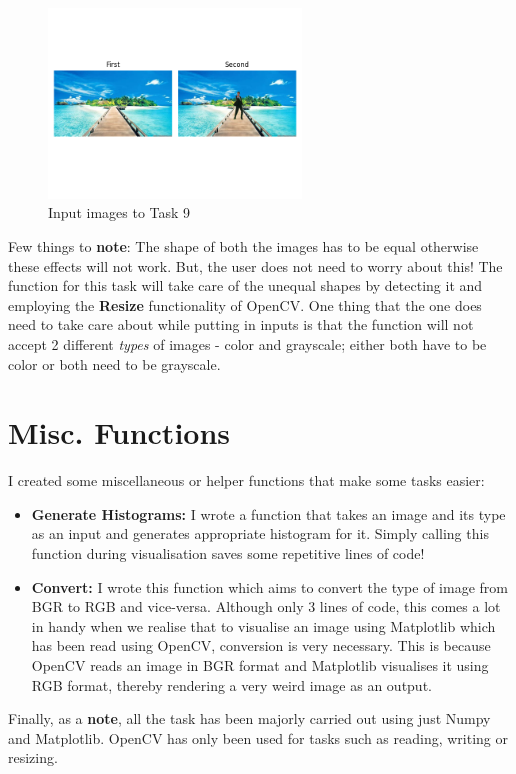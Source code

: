 \documentclass[notitlepage]{report}
\begin{document}
\begin{figure}[htp]
    \centering
    \hypertarget{T9_in}{\includegraphics[width = 0.6\textwidth]{T9_in.png}}
    \caption{Input images to Task 9}
    \label{fig17:sysfig}
\end{figure}

Few things to \textbf{note}: The shape of both the images has to be equal otherwise these effects will not work. But, the user does not need to worry about this! The function for 
this task will take care of the unequal shapes by detecting it and employing the \textbf{Resize} functionality of OpenCV. One thing that the one does need to take care about while
putting in inputs is that the function will not accept 2 different \textit{types} of images - color and grayscale; either both have to be color or both need to be grayscale. 

\section{Misc. Functions}
I created some miscellaneous or helper functions that make some tasks easier:
\begin{itemize}
    \item \textbf{Generate Histograms:} I wrote a function that takes an image and its type as an input and generates appropriate histogram for it. Simply
    calling this function during visualisation saves some repetitive lines of code!
    \item \textbf{Convert:} I wrote this function which aims to convert the type of image from BGR to RGB and vice-versa. Although only 3 lines of code, this comes a lot in handy 
    when we realise that to visualise an image using Matplotlib which has been read using OpenCV, conversion is very necessary. This is because OpenCV reads an image in BGR format 
    and Matplotlib visualises it using RGB format, thereby rendering a very weird image as an output.
\end{itemize}

Finally, as a \textbf{note}, all the task has been majorly carried out using just Numpy and Matplotlib. OpenCV has only been used for tasks such as reading, writing or resizing.
\end{document}

